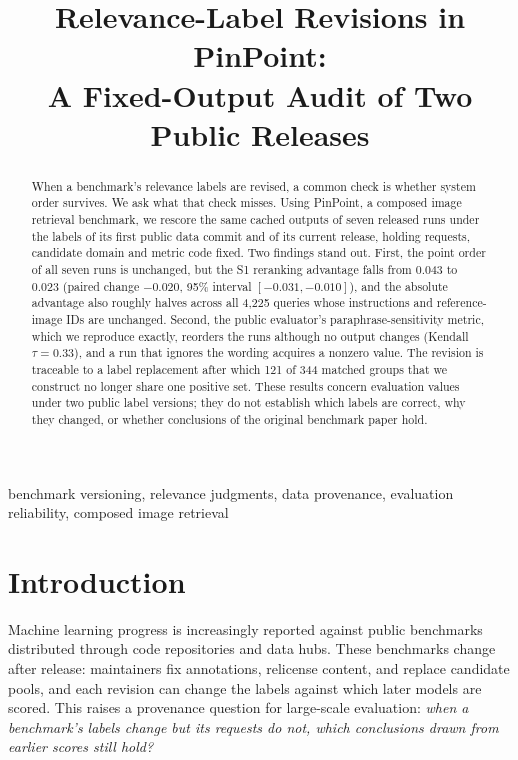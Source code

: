 \documentclass[conference]{IEEEtran}
\begin{document}
\title{Relevance-Label Revisions in PinPoint:\\
A Fixed-Output Audit of Two Public Releases}

\author{
}

\maketitle

\begin{abstract}
When a benchmark's relevance labels are revised, a common check is whether system order survives. We ask what that check misses. Using PinPoint, a composed image retrieval benchmark, we rescore the same cached outputs of seven released runs under the labels of its first public data commit and of its current release, holding requests, candidate domain and metric code fixed. Two findings stand out. First, the point order of all seven runs is unchanged, but the S1 reranking advantage falls from 0.043 to 0.023 (paired change $-0.020$, 95\% interval $[-0.031,-0.010]$), and the absolute advantage also roughly halves across all 4,225 queries whose instructions and reference-image IDs are unchanged. Second, the public evaluator's paraphrase-sensitivity metric, which we reproduce exactly, reorders the runs although no output changes (Kendall $\tau=0.33$), and a run that ignores the wording acquires a nonzero value. The revision is traceable to a label replacement after which 121 of 344 matched groups that we construct no longer share one positive set. These results concern evaluation values under two public label versions; they do not establish which labels are correct, why they changed, or whether conclusions of the original benchmark paper hold.
\end{abstract}

\begin{IEEEkeywords}
benchmark versioning, relevance judgments, data provenance, evaluation reliability, composed image retrieval
\end{IEEEkeywords}

\section{Introduction}
Machine learning progress is increasingly reported against public benchmarks distributed through code repositories and data hubs. These benchmarks change after release: maintainers fix annotations, relicense content, and replace candidate pools, and each revision can change the labels against which later models are scored. This raises a provenance question for large-scale evaluation: \emph{when a benchmark's labels change but its requests do not, which conclusions drawn from earlier scores still hold?}
\end{document}
